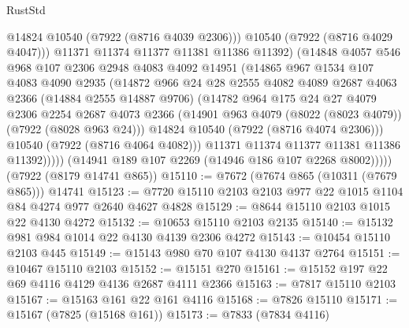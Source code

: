 \begin{lexlean}{RustStd}
\begin{coremodule}
                      @14824
                      @10540
                      (@7922 (@8716 @4039 @2306)))
                    @10540
                    (@7922 (@8716 @4029 @4047)))
                  @11371
                  @11374
                  @11377
                  @11381
                  @11386
                  @11392)
                (@14848
                  @4057
                  @546
                  @968
                  @107
                  @2306
                  @2948
                  @4083
                  @4092
                  @14951
                  (@14865
                    @967
                    @1534
                    @107
                    @4083
                    @4090
                    @2935
                    (@14872
                      @966
                      @24
                      @28
                      @2555
                      @4082
                      @4089
                      @2687
                      @4063
                      @2366
                      (@14884 @2555 @14887 @9706)
                      (@14782
                        @964
                        @175
                        @24
                        @27
                        @4079
                        @2306
                        @2254
                        @2687
                        @4073
                        @2366
                        (@14901 @963 @4079 (@8022 (@8023 @4079)) (@7922 (@8028 @963 @24)))
                        @14824
                        @10540
                        (@7922 (@8716 @4074 @2306)))
                      @10540
                      (@7922 (@8716 @4064 @4082)))
                    @11371
                    @11374
                    @11377
                    @11381
                    @11386
                    @11392)))))
          (@14941 @189 @107 @2269 (@14946 @186 @107 @2268 @8002)))))
    (@7922 (@8179 @14741 @865))
@15110 := @7672 (@7674 @865 (@10311 (@7679 @865))) @14741
@15123 := @7720 @15110 @2103 @2103 @977 @22 @1015 @1104 @84 @4274 @977 @2640 @4627 @4828
@15129 := @8644 @15110 @2103 @1015 @22 @4130 @4272
@15132 := @10653 @15110 @2103 @2135
@15140 := @15132 @981 @984 @1014 @22 @4130 @4139 @2306 @4272
@15143 := @10454 @15110 @2103 @445
@15149 := @15143 @980 @70 @107 @4130 @4137 @2764
@15151 := @10467 @15110 @2103
@15152 := @15151 @270
@15161 := @15152 @197 @22 @69 @4116 @4129 @4136 @2687 @4111 @2366
@15163 := @7817 @15110 @2103
@15167 := @15163 @161 @22 @161 @4116
@15168 := @7826 @15110
@15171 := @15167 (@7825 (@15168 @161))
@15173 := @7833 (@7834 @4116)

\end{coremodule}
\end{lexlean}
